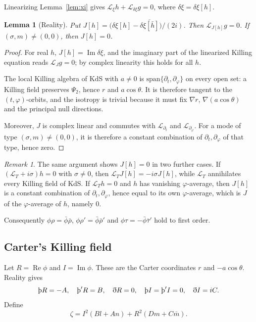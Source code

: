 \documentclass[11pt]{amsart}
\newtheorem{lemma}[theorem]{Lemma}
\theoremstyle{definition}
\theoremstyle{remark}
\newtheorem{remark}[theorem]{Remark}
\numberwithin{equation}{section}
\newcommand{\Th}{\text{\th}}
\newcommand{\cL}{\mathcal{L}}
\renewcommand{\Im}{\operatorname{Im}}
\renewcommand{\Re}{\operatorname{Re}}
\begin{document}
Linearizing Lemma~\ref{lem:xi} gives $\cL_\xi h+\cL_{\delta\xi}g=0$, where $\delta\xi=\delta\xi[h]$.

\begin{lemma}[Reality]\label{lem:reality}
Put $J[h]=\big(\delta\xi[h]-\overline{\delta\xi[\bar h]}\big)/(2i)$. Then $\cL_{J[h]}g=0$. If $(\sigma,m)\ne(0,0)$,
then $J[h]=0$.
\end{lemma}
\begin{proof}
For real $h$, $J[h]=\Im\delta\xi$, and the imaginary part of the linearized Killing equation reads $\cL_Jg=0$;
by complex linearity this holds for all $h$.

The local Killing algebra of KdS with $a\neq0$ is $\mathrm{span}\{\partial_t,\partial_\varphi\}$ on every open set:
a Killing field preserves $\Psi_2$, hence $r$ and $a\cos\theta$. It is therefore tangent to the $(t,\varphi)$-orbits,
and the isotropy is trivial because it must fix $\nabla r$, $\nabla(a\cos\theta)$ and the principal null directions.

Moreover, $J$ is complex linear and commutes with $\cL_{\partial_t}$ and $\cL_{\partial_\varphi}$. For a mode of type
$(\sigma,m)\ne(0,0)$, it is therefore a constant combination of $\partial_t,\partial_\varphi$ of that type, hence zero.
\end{proof}

\begin{remark}\label{rem:Jvanish}
The same argument shows $J[h]=0$ in two further cases. If $(\cL_T+i\sigma)h=0$ with $\sigma\ne0$, then
$\cL_TJ[h]=-i\sigma J[h]$, while $\cL_T$ annihilates every Killing field of KdS. If $\cL_Th=0$ and $h$ has vanishing
$\varphi$-average, then $J[h]$ is a constant combination of $\partial_t,\partial_\varphi$, hence equal to its own
$\varphi$-average, which is $J$ of the $\varphi$-average of $h$, namely $0$.
\end{remark}

Consequently $\phi\rho=\bar\phi\bar\rho$, $\phi\rho'=\bar\phi\bar\rho'$ and $\phi\tau=-\bar\phi\bar\tau'$ hold to
first order.

\subsection{Carter's Killing field}
Let $R=\Re\phi$ and $I=\Im\phi$. These are the Carter coordinates $r$ and $-a\cos\theta$. Reality gives
\[
\Th R=-A,\quad \Th'R=B,\quad \eth R=0,\quad \Th I=\Th'I=0,\quad \eth I=iC.
\]
Define
\[
\zeta=I^2(Bl+An)+R^2(Dm+C\bar m).
\]
\end{document}
